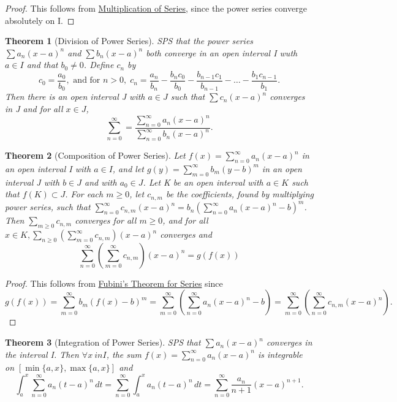 \documentclass[11pt, oneside]{book}
\theoremstyle{break}
\newtheorem{thm}{Theorem}[section]
\newtheorem*{proof}{Proof}
\begin{document}
\begin{proof}
	This follows from \hyperref[series_multiplication]{Multiplication of Series}, since the power series converge absolutely on I.
\end{proof}

\begin{thm}[Division of Power Series]
	SPS that the power series $\sum a_n (x-a)^n$ and $\sum b_n (x-a)^n$ both converge in an open interval I wuth $a \in I$ and that $b_0 \neq 0$. Define $c_n$ by
	\[
		c_0 = \frac{a_0}{b_0}, \text{ and for } n > 0, \; c_n = \frac{a_n}{b_n} - \frac{b_n c_0}{b_0} - \frac{b_{n-1} c_1}{b_{n-1}} - \hdots - \frac{b_1 c_{n-1}}{b_1}. 
	\]
	Then there is an open interval J with $a \in J$ such that $\sum c_n (x-a)^n$ converges in J and for all $x \in J$,
	\[
		\sum_{n = 0}^{\infty} = \frac{ \sum\limits_{n=0}^{\infty} a_n (x-a)^n }{ \sum\limits_{n=0}^{\infty} b_n (x-a)^n }.
	\]
\end{thm}

\begin{thm}[Composition of Power Series]
	Let $f(x) = \sum\limits_{n=0}^{\infty} a_n (x-a)^n$ in an open interval I with $a \in I$, and let $g(y) = \sum\limits_{m=0}^{\infty} b_m (y-b)^m$ in an open interval J with $b \in J$ and with $a_0 \in J$. Let K be an open interval with $a \in K$ such that $f(K) \subset J$. For each $m \geq 0$, let $c_{n, m}$ be the coefficients, found by multiplying power series, such that $\sum\limits_{n=0}^{\infty} c_{n, m} (x-a)^n = b_n \left( \sum\limits_{n=0}^{\infty} a_n (x-a)^n - b \right)^m$. Then $\sum_{m \geq 0} c_{n, m}$ converges for all $m \geq 0$, and for all $x \in K, \sum\limits_{n \geq 0} \left( \sum\limits_{m = 0}^{\infty} c_{n, m} \right)(x-a)^n$ converges and
	\[
		\sum_{n=0}^{\infty} \left( \sum_{m=0}^{\infty} c_{n, m} \right)(x-a)^n = g(f(x))
	\]
\end{thm}

\begin{proof}
	This follows from \hyperref[fubinithm_series]{Fubini's Theorem for Series} since
	\[
		g(f(x)) = \sum_{m=0}^{\infty} b_m (f(x) - b)^m = \sum_{m=0}^{\infty} \left(\sum_{n=0}^{\infty} a_n (x-a)^n - b \right) = \sum_{m=0}^{\infty} \left( \sum_{n=0}^{\infty} c_{n, m} (x-a)^n \right).
	\]
\end{proof}

\begin{thm}[Integration of Power Series]
	SPS that $\sum a_n (x-a)^n$ converges in the interval I. Then $\forall x\ in I$, the sum $f(x) = \sum_{n=0}^{\infty} a_n (x-a)^n$ is integrable on $[\min\{a, x\}, \max\{a, x\}]$ and
	\[
		\int_{a}^{x} \sum_{n=0}^{\infty} a_n (t-a)^n \, dt = \sum_{n=0}^{\infty} \int_{a}^{x} a_n (t-a)^n \, dt = \sum_{n=0}^{\infty} \frac{a_n}{n+1} (x-a)^{n+1}.
	\]
\end{thm}
\end{document}
